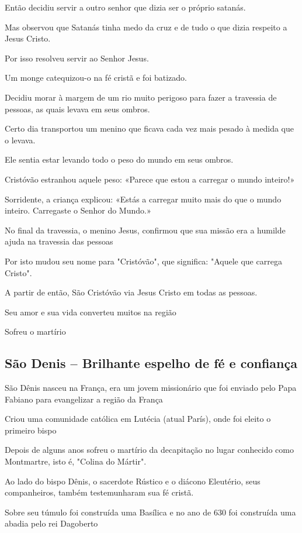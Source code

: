 \documentclass[a4paper,12pt]{extarticle} \usepackage[utf8]{inputenc}
\begin{document}
Então decidiu servir a outro senhor que dizia ser o próprio satanás.

Mas observou que Satanás tinha medo da cruz e de tudo o que dizia respeito a Jesus Cristo.

Por isso resolveu servir ao Senhor Jesus.

Um monge catequizou-o na fé cristã e foi batizado.

Decidiu morar à margem de um rio muito perigoso para fazer a travessia de pessoas, as quais levava em seus ombros.

Certo dia transportou um menino que ficava cada vez mais pesado à medida que o levava.

Ele sentia estar levando todo o peso do mundo em seus ombros.

Cristóvão estranhou aquele peso: «Parece que estou a carregar o mundo inteiro!»

Sorridente, a criança explicou: «Estás a carregar muito mais do que o mundo inteiro. Carregaste o Senhor do Mundo.»

No final da travessia, o menino Jesus, confirmou que sua missão era a humilde ajuda na travessia das pessoas

Por isto mudou seu nome para "Cristóvão", que significa: "Aquele que carrega Cristo".

A partir de então, São Cristóvão via Jesus Cristo em todas as pessoas.

Seu amor e sua vida converteu muitos na região

Sofreu o martírio
 

\subsection{São Denis – Brilhante espelho de fé e confiança}

São Dênis nasceu na França, era um jovem missionário que foi enviado pelo Papa Fabiano para evangelizar a região da França

Criou uma comunidade católica em Lutécia (atual París), onde foi eleito o primeiro bispo

Depois de alguns anos sofreu o martírio da decapitação no lugar conhecido como Montmartre, isto é, "Colina do Mártir".

Ao lado do bispo Dênis, o sacerdote Rústico e o diácono Eleutério, seus companheiros, também testemunharam sua fé cristã.

Sobre seu túmulo foi construída uma Basílica e no ano de 630 foi construída uma abadia pelo rei Dagoberto
\end{document}
